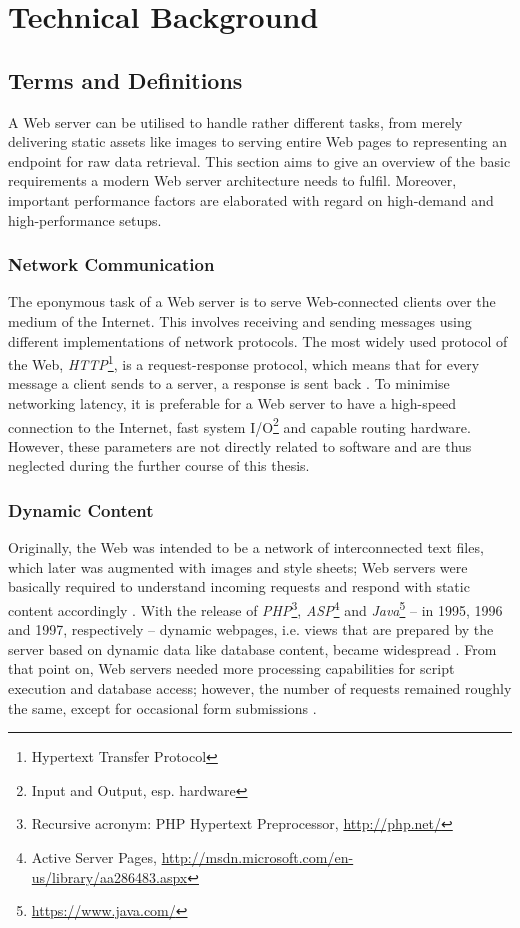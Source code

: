 \chapter{Technical Background}

\section{Terms and Definitions}
\label{sec:terms}

A Web server can be utilised to handle rather different tasks, from merely delivering static assets like images to serving entire Web pages to representing an endpoint for raw data retrieval. This section aims to give an overview of the basic requirements a modern Web server architecture needs to fulfil. Moreover, important performance factors are elaborated with regard on high-demand and high-performance setups.

\subsection{Network Communication}
The eponymous task of a Web server is to serve Web-connected clients over the medium of the Internet. This involves receiving and sending messages using different implementations of network protocols. The most widely used protocol of the Web, \textit{HTTP}\footnote{Hypertext Transfer Protocol}, is a request-response protocol, which means that for every message a client sends to a server, a response is sent back \cite{http}. To minimise networking latency, it is preferable for a Web server to have a high-speed connection to the Internet, fast system I/O\footnote{\label{lab:io}Input and Output, esp. hardware} and capable routing hardware. However, these parameters are not directly related to software and are thus neglected during the further course of this thesis.

\subsection{Dynamic Content}
Originally, the Web was intended to be a network of interconnected text files, which later was augmented with images and style sheets; Web servers were basically required to understand incoming requests and respond with static content accordingly \cite{http}. With the release of \textit{PHP}\footnote{Recursive acronym: PHP Hypertext Preprocessor, \url{http://php.net/}}, \textit{ASP}\footnote{Active Server Pages, \url{http://msdn.microsoft.com/en-us/library/aa286483.aspx}} and \textit{Java}\footnote{\url{https://www.java.com/}} -- in 1995, 1996 and 1997, respectively -- dynamic webpages, i.e. views that are prepared by the server based on dynamic data like database content, became widespread \cite{webhistory}. From that point on, Web servers needed more processing capabilities for script execution and database access; however, the number of requests remained roughly the same, except for occasional form submissions \cite{webhistory}.

